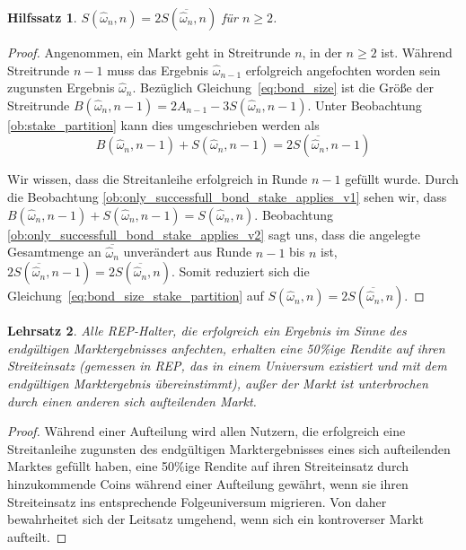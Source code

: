 \documentclass[floatfix,reprint,nofootinbib,amsmath,amssymb,epsfig,pre,floats,letterpaper,groupedaffiliation]{revtex4-1}
\newcommand{\beq}{\begin{equation}}
\newcommand{\eeq}{\end{equation}}
\newtheorem{theorem}{Lehrsatz}
\newtheorem{lemma}[theorem]{Hilfssatz}
\theoremstyle{definition}
\theoremstyle{definition}
\theoremstyle{definition}
\begin{document}
\begin{appendix}
\begin{lemma}\label{le:tentative_outcomes_are_a_third_of_all_stake}
$S(\hat{\omega}_{n},n) = 2S(\overline{\hat{\omega}_{n}},n)$ für $n \geq 2$.
\end{lemma}

\begin{proof}
Angenommen, ein Markt geht in Streitrunde $n$, in der $n \geq 2$ ist. Während Streitrunde $n-1$ muss das Ergebnis $\hat{\omega}_{n-1}$ erfolgreich angefochten worden sein zugunsten Ergebnis $\hat{\omega}_{n}$.  Bezüglich Gleichung~\ref{eq:bond_size} ist die Größe der Streitrunde $B(\hat{\omega}_{n},n-1) = 2A_{n-1} - 3S(\hat{\omega}_{n},n-1)$. Unter Beobachtung \ref{ob:stake_partition} kann dies umgeschrieben werden als
\beq \label{eq:bond_size_stake_partition}
B(\hat{\omega}_{n},n-1) + S(\hat{\omega}_{n},n-1) = 2S(\overline{\hat{\omega}_{n}},n-1)
\eeq

Wir wissen, dass die Streitanleihe erfolgreich in Runde $n-1$ gefüllt wurde. Durch die Beobachtung \ref{ob:only_successfull_bond_stake_applies_v1} sehen wir, dass $B(\hat{\omega}_{n},n-1) + S(\hat{\omega}_{n},n-1) = S(\hat{\omega}_{n},n)$. Beobachtung \ref{ob:only_successfull_bond_stake_applies_v2} sagt uns, dass die angelegte Gesamtmenge an $\overline{\hat{\omega}_{n}}$ unverändert aus Runde $n-1$ bis $n$ ist, $2S(\overline{\hat{\omega}_{n}},n-1) = 2S(\overline{\hat{\omega}_{n}},n)$. Somit reduziert sich die Gleichung~\ref{eq:bond_size_stake_partition} auf $S(\hat{\omega}_{n},n) = 2S(\overline{\hat{\omega}_{n}},n)$.
\end{proof}

\begin{theorem}\label{th:roi_guarantee}
Alle REP-Halter, die erfolgreich ein Ergebnis im Sinne des endgültigen Marktergebnisses anfechten, erhalten eine 50\%ige Rendite auf ihren Streiteinsatz (gemessen in REP, das in einem Universum existiert und mit dem endgültigen Marktergebnis übereinstimmt), außer der Markt ist unterbrochen durch einen anderen sich aufteilenden Markt.
\end{theorem}

\begin{proof}
Während einer Aufteilung wird allen Nutzern, die erfolgreich eine Streitanleihe zugunsten des endgültigen Marktergebnisses eines sich aufteilenden Marktes gefüllt haben, eine 50\%ige Rendite auf ihren Streiteinsatz durch hinzukommende Coins während einer Aufteilung gewährt, wenn sie ihren Streiteinsatz ins entsprechende Folgeuniversum migrieren. Von daher bewahrheitet sich der Leitsatz umgehend, wenn sich ein kontroverser Markt aufteilt.


\end{proof}
\end{appendix}
\end{document}
